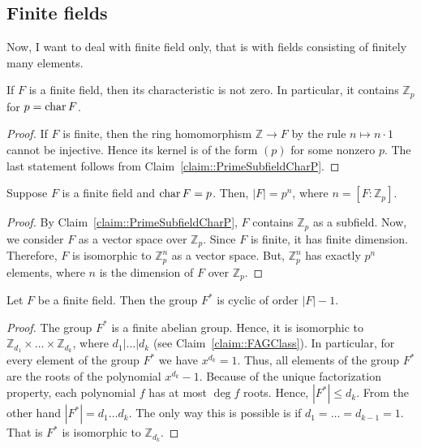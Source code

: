 \subsection{Finite fields}

Now, I want to deal with finite field only, that is with fields consisting of finitely many elements.

\begin{claim}
If $F$ is a finite field, then its characteristic is not zero.
In particular, it contains $\mathbb Z_p$ for $p = \operatorname{char} F$.
\end{claim}
\begin{proof}
If $F$ is finite, then the ring homomorphism $\mathbb Z \to F$ by the rule $n \mapsto n \cdot 1$ cannot be injective.
Hence its kernel is of the form $(p)$ for some nonzero $p$.
The last statement follows from Claim~\ref{claim::PrimeSubfieldCharP}.
\end{proof}

\begin{claim}
Suppose $F$ is a finite field and $\operatorname{char} F = p$.
Then, $|F| = p^n$, where $n = [F:\mathbb Z_p]$.
\end{claim}
\begin{proof}
By Claim~\ref{claim::PrimeSubfieldCharP}, $F$ contains $\mathbb Z_p$ as a subfield.
Now, we consider $F$ as a vector space over $\mathbb Z_p$.
Since $F$ is finite, it has finite dimension.
Therefore, $F$ is isomorphic to $\mathbb Z_p^n$ as a vector space.
But, $\mathbb Z_p^n$ has exactly $p^n$ elements, where $n$ is the dimension of $F$ over $\mathbb Z_p$.
\end{proof}

\begin{claim}
Let $F$ be a finite field.
Then the group $F^*$ is cyclic of order $|F| - 1$.
\end{claim}
\begin{proof}
The group $F^*$ is a finite abelian group.
Hence, it is isomorphic to $\mathbb Z_{d_1}\times \ldots \times \mathbb Z_{d_k}$, where $d_1|\ldots |d_k$ (see Claim~\ref{claim::FAGClass}).
In particular, for every element of the group $F^*$ we have $x^{d_k} = 1$.
Thus, all elements of the group $F^*$ are the roots of the polynomial $x^{d_k}-1$.
Because of the unique factorization property, each polynomial $f$ has at most $\deg f$ roots.
Hence, $|F^*|\leqslant d_k$.
From the other hand $|F^*| = d_1\ldots d_k$.
The only way this is possible is if $d_1 = \ldots =d_{k-1} = 1$.
That is $F^*$ is isomorphic to $\mathbb Z_{d_k}$.
\end{proof}

